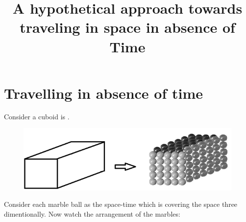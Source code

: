 \documentclass[conference]{IEEEtran}
\begin{document}
\title{A hypothetical approach towards traveling in space in absence of Time}
\author
{
}
\maketitle
\section{Travelling in absence of time}
Consider a cuboid is .
\begin{figure}[htbp]
\centering
		\includegraphics[scale=0.5]{img1.png}
\end{figure}
Consider each marble ball as the space-time which is covering the space three dimentionally. Now watch the arrangement of the marbles:
\end{document}
